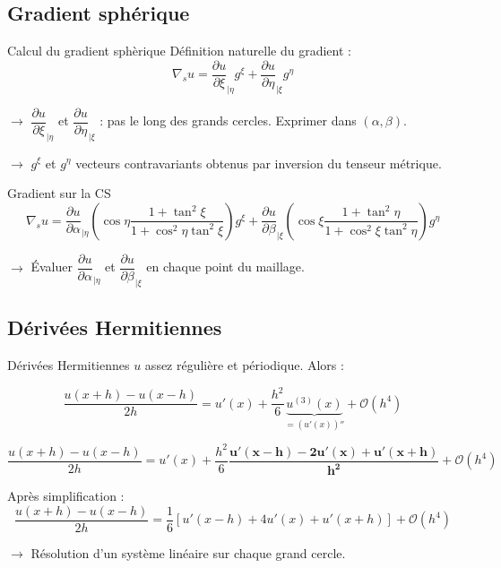 \documentclass[11pt]{beamer}
\begin{document}
\subsection{Gradient sphérique}
\begin{frame}{Calcul du gradient sphèrique}
Définition naturelle du gradient :
$$\nabla_s u = \dfrac{\partial u}{\partial \xi}_{|\eta} g^\xi + \dfrac{\partial u}{\partial \eta}_{|\xi} g^\eta $$

$\rightarrow$ $\dfrac{\partial u}{\partial \xi}_{|\eta}$ et $\dfrac{\partial u}{\partial \eta}_{|\xi}$ : pas le long des grands cercles. Exprimer dans $(\alpha, \beta)$.

$\rightarrow$ $g^\xi$ et $g^\eta$ vecteurs contravariants obtenus par inversion du tenseur métrique.
\pause

\begin{block}{Gradient sur la CS}
$$\nabla_s u = \frac{\partial u}{\partial \alpha}_{|\eta} \left( \cos \eta \dfrac{1+ \tan^2 \xi}{1 + \cos^2 \eta \tan^2 \xi} \right) g^\xi + \frac{\partial u}{\partial \beta}_{|\xi} \left( \cos \xi \dfrac{1+ \tan^2 \eta}{1 + \cos^2 \xi \tan^2 \eta} \right) g^\eta $$
\end{block}

$\rightarrow$ Évaluer $\dfrac{\partial u}{\partial \alpha}_{|\eta}$ et $\dfrac{\partial u}{\partial \beta}_{|\xi}$ en chaque point du maillage.
\end{frame}



\subsection{Dérivées Hermitiennes}
\begin{frame}{Dérivées Hermitiennes}
$u$ assez régulière et périodique. Alors :

$$\dfrac{u(x+h)-u(x-h)}{2h} = u'(x) + \dfrac{h^2}{6} \underbrace{u^{(3)}(x)}_{= \left( u'(x) \right)''} + \mathcal{O}\left( h^4 \right)$$

\pause

$$\dfrac{u(x+h)-u(x-h)}{2h} = u'(x) + \dfrac{h^2}{6} \mathbf{ \dfrac{u'(x-h) - 2 u'(x) + u'(x+h) }{h^2}} + \mathcal{O}\left( h^4 \right)$$

\begin{block}{}
Après simplification :
$$\dfrac{u(x+h)-u(x-h)}{2h} = \dfrac{1}{6} \left[ u'(x-h) + 4 u'(x) + u'(x+h) \right] + \mathcal{O}\left( h^4 \right)$$
\end{block}

$\rightarrow$ Résolution d'un système linéaire sur chaque grand cercle.
\end{frame}
\end{document}
